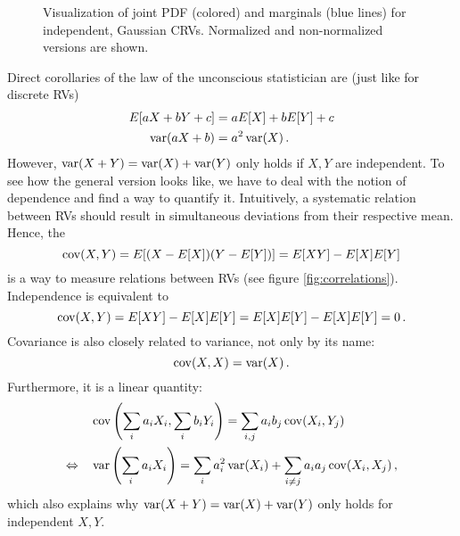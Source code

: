 \begin{figure}
\centering


%
\hspace{0.04\textwidth}%
%


\caption{Visualization of joint PDF (colored) and marginals (blue lines) for independent, Gaussian CRVs. Normalized and non-normalized versions are shown.}
\label{fig:joint_marginal_PDF}
\end{figure}



Direct corollaries of the law of the unconscious statistician are (just like for discrete RVs)
\begin{align*}
E[a X + b Y + c] &= a E[X] + b E[Y] + c
\\
\operatorname{var}(a X + b) &= a^2 \operatorname{var}(X) \, .
\end{align*}
However, $\operatorname{var}(X + Y) = \operatorname{var}(X) + \operatorname{var}(Y)$ only holds if $X, Y$ are independent. To see how the general version looks like, we have to deal with the notion of dependence and find a way to quantify it. Intuitively, a systematic relation between RVs should result in simultaneous deviations from their respective mean. Hence, the 
\begin{equation}
\operatorname{cov}(X, Y) = E[(X - E[X]) (Y - E[Y])] = E[X Y] - E[X] E[Y]
\end{equation}
is a way to measure relations between RVs (see figure \ref{fig:correlations}). Independence is equivalent to
\begin{equation}
\operatorname{cov}(X, Y) = E[X Y] - E[X] E[Y] = E[X] E[Y] - E[X] E[Y] = 0 \, .
\end{equation}
Covariance is also closely related to variance, not only by its name:
\begin{equation}
\operatorname{cov}(X, X) = \operatorname{var}(X) \, .
\end{equation}
Furthermore, it is a linear quantity:
\begin{equation}
\begin{split}
&\operatorname{cov}\qty(\sum_i a_i X_i, \sum_i b_i Y_i) = \sum_{i, j} a_i b_j \operatorname{cov}(X_i, Y_j)
\\
\Leftrightarrow \quad &\operatorname{var}\qty(\sum_i a_i X_i) = \sum_i a_i^2 \operatorname{var}(X_i) + \sum_{i \neq j} a_i a_j \operatorname{cov}(X_i, X_j) \, ,
\end{split}
\end{equation}
which also explains why $\operatorname{var}(X + Y) = \operatorname{var}(X) + \operatorname{var}(Y)$ only holds for independent $X, Y$.\\


